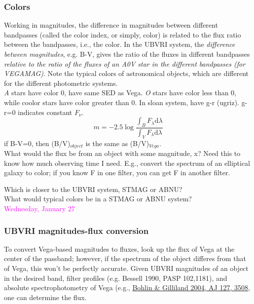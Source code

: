 \documentclass[12pt]{article}
\begin{document}
\subsubsection*{Colors}
Working in magnitudes, the difference in magnitudes between different
bandpasses (called the color index, or simply, color) is related to
the flux ratio between the bandpasses, i.e., the color.
In the UBVRI
system, the \emph{difference between magnitudes}, e.g. B-V,
gives the ratio of the fluxes in different bandpasses
\emph{relative to the ratio of the fluxes of
an A0V star in the different bandpasses (for VEGAMAG)}.
Note the typical colors of astronomical objects,
which are different for the different photometric systems.\\
\emph{A} stars have color 0, have same SED as Vega. \emph{O} stars
have color less than 0, while coolor stars have color greater than 0.
In sloan system, have  g-r (ugriz). g-r=0 indicates constant
$F_{\nu}$.
\begin{equation*}
    m = -2.5\log\frac{\int_B F_{\lambda}\textrm{d}\lambda}
    {\int_V F_{\lambda}\textrm{d}\lambda}
\end{equation*}
if B-V=0, then (B/V)$_{object}$ is the same as (B/V)$_{Vega}$.\\

\noindent What would the flux be from an object with some magnitude,
x? Need this to know how much observing time I need. E.g., convert the
spectrum of an elliptical galaxy to color; if you know F in one
filter, you can get F in another filter.

\noindent Which is closer to the UBVRI system, STMAG or ABNU?\\
\noindent What would typical colors be in a STMAG or ABNU system?\\

\noindent \textcolor{magenta}{Wednesday, January 27}\\

\subsubsection*{UBVRI magnitudes-flux conversion}
To convert Vega-based magnitudes to fluxes, look up the flux of Vega
at the center of the passband; however, if the spectrum of the object
differes from that of Vega, this won't be perfectly accurate. Given
UBVRI magnitudes of an object in the desired band, filter profiles
(e.g. Bessell 1990, PASP 102,1181), and absolute spectrophotometry of
Vega (e.g., \href{http://adsabs.harvard.edu/abs/2004AJ....127.3508B}
{Bohlin \& Gilliland 2004, AJ 127, 3508}, one can determine
the flux.\\
\end{document}
